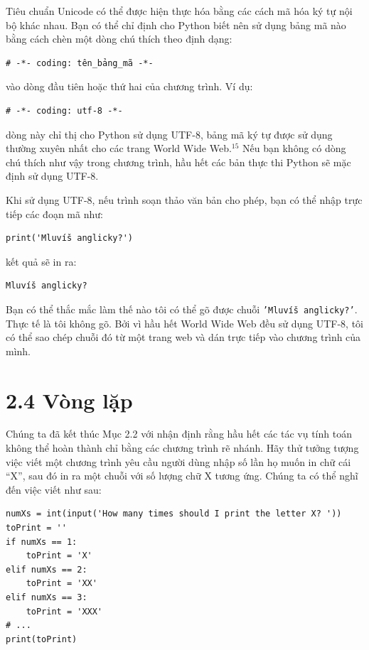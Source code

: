 Tiêu chuẩn Unicode có thể được hiện thực hóa bằng các cách mã hóa ký tự nội bộ khác nhau. Bạn có thể chỉ định cho Python biết nên sử dụng bảng mã nào bằng cách chèn một dòng chú thích theo định dạng:

\begin{verbatim}
# -*- coding: tên_bảng_mã -*-
\end{verbatim}

vào dòng đầu tiên hoặc thứ hai của chương trình. Ví dụ:

\begin{verbatim}
# -*- coding: utf-8 -*-
\end{verbatim}

dòng này chỉ thị cho Python sử dụng UTF-8, bảng mã ký tự được sử dụng thường xuyên nhất cho các trang World Wide Web.$^{15}$ Nếu bạn không có dòng chú thích như vậy trong chương trình, hầu hết các bản thực thi Python sẽ mặc định sử dụng UTF-8.

Khi sử dụng UTF-8, nếu trình soạn thảo văn bản cho phép, bạn có thể nhập trực tiếp các đoạn mã như:

\begin{verbatim}
print('Mluvíš anglicky?')
\end{verbatim}

kết quả sẽ in ra:

\begin{verbatim}
Mluvíš anglicky?
\end{verbatim}

Bạn có thể thắc mắc làm thế nào tôi có thể gõ được chuỗi \texttt{'Mluvíš anglicky?'}. Thực tế là tôi không gõ. Bởi vì hầu hết World Wide Web đều sử dụng UTF-8, tôi có thể sao chép chuỗi đó từ một trang web và dán trực tiếp vào chương trình của mình.

\section*{2.4 Vòng lặp}

\noindent \indent Chúng ta đã kết thúc Mục 2.2 với nhận định rằng hầu hết các tác vụ tính toán không thể hoàn thành chỉ bằng các chương trình rẽ nhánh. Hãy thử tưởng tượng việc viết một chương trình yêu cầu người dùng nhập số lần họ muốn in chữ cái ``X'', sau đó in ra một chuỗi với số lượng chữ X tương ứng. Chúng ta có thể nghĩ đến việc viết như sau:

\begin{verbatim}
numXs = int(input('How many times should I print the letter X? '))
toPrint = ''
if numXs == 1:
    toPrint = 'X'
elif numXs == 2:
    toPrint = 'XX'
elif numXs == 3:
    toPrint = 'XXX'
# ...
print(toPrint)
\end{verbatim}

